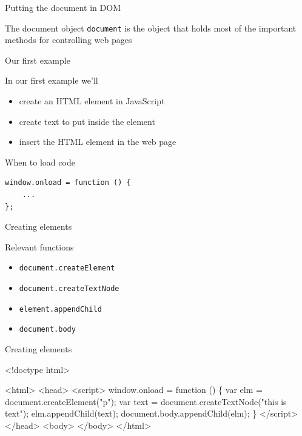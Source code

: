 \documentclass{beamer}
\begin{document}
\begin{frame}[fragile]{Putting the document in DOM}
 \begin{block}{The document object}
   \texttt{document} is the object that holds most of the important methods for controlling web pages 
 \end{block}
\end{frame}

\begin{frame}{Our first example}
\begin{block}{}
  In our first example we'll
  \begin{itemize}
    \item<1,2> create an HTML element in JavaScript
    \item<1,3> create text to put inside the element
    \item<1,4> insert the HTML element in the web page
  \end{itemize}
\end{block}
\end{frame}

\begin{frame}[fragile]{When to load code}
\begin{block}{}
 \begin{verbatim}
window.onload = function () {
    ... 
};
\end{verbatim}
\end{block}
\end{frame}

\begin{frame}[fragile]{Creating elements}

    \begin{block}{Relevant functions}
      \begin{itemize}
        \item \texttt{document.createElement}
        \item \texttt{document.createTextNode}
        \item \texttt{element.appendChild}
        \item \texttt{document.body}
      \end{itemize}
    \end{block}

\end{frame}

\begin{frame}[fragile]{Creating elements}
    \begin{block}{}
      \begin{semiverbatim}
<!doctype html>

<html>
  <head>
    <script>
      window.onload = function () \{
        var elm = document.createElement("p");
        var text = document.createTextNode("this is text");
        elm.appendChild(text);
        document.body.appendChild(elm);
      \}
    </script>
  </head>
  <body>
  </body>
</html>
      \end{semiverbatim}
    \end{block}
\end{frame}
\end{document}

